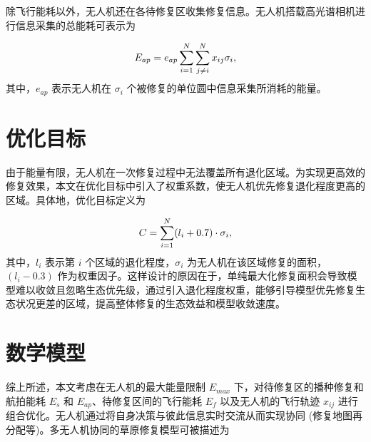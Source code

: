 \documentclass[AutoFakeBold]{LZUThesis}
\begin{document}
除飞行能耗以外，无人机还在各待修复区收集修复信息。无人机搭载高光谱相机进行信息采集的总能耗可表示为

\begin{equation} \label{hyper-spectral-camera-energy}
	\begin{scriptsize}
		E_{ap} = e_{ap}\sum^N_{i=1}\sum^N_{j \neq i} x_{ij}\sigma_i,
	\end{scriptsize}
\end{equation}
其中，$e_{ap}$ 表示无人机在 $\sigma_i$ 个被修复的单位圆中信息采集所消耗的能量。

\section{优化目标}

由于能量有限，无人机在一次修复过程中无法覆盖所有退化区域。为实现更高效的修复效果，本文在优化目标中引入了权重系数，使无人机优先修复退化程度更高的区域。具体地，优化目标定义为

\begin{equation} \label{maximize-weighted-sum}
	\begin{small}
		C = \sum_{i=1}^{N} (l_i + 0.7) \cdot \sigma_i,
	\end{small}
\end{equation}
其中，$l_i$ 表示第 $i$ 个区域的退化程度，$\sigma_i$ 为无人机在该区域修复的面积，$(l_i - 0.3)$ 作为权重因子。这样设计的原因在于，单纯最大化修复面积会导致模型难以收敛且忽略生态优先级，通过引入退化程度权重，能够引导模型优先修复生态状况更差的区域，提高整体修复的生态效益和模型收敛速度。

\section{数学模型}

综上所述，本文考虑在无人机的最大能量限制 $E_{max}$ 下，对待修复区的播种修复和航拍能耗 $E_s$ 和 $E_{ap}$、待修复区间的飞行能耗 $E_f$ 以及无人机的飞行轨迹 $x_{ij}$ 进行组合优化。无人机通过将自身决策与彼此信息实时交流从而实现协同 (修复地图再分配等)。多无人机协同的草原修复模型可被描述为
\end{document}
